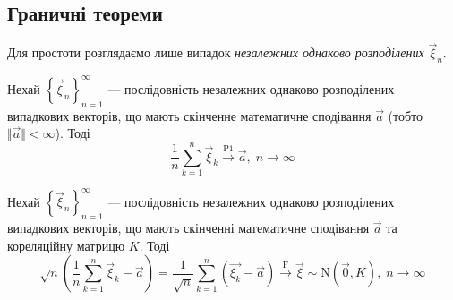 \subsection{Граничні теореми}
Для простоти розглядаємо лише випадок \emph{незалежних однаково розподілених} $\vec{\xi}_n$.
\begin{theorem*}
    Нехай $\left\{ \vec{\xi}_n\right\}_{n=1}^{\infty}$ --- послідовність незалежних однаково розподілених випадкових векторів, що мають скінченне
    математичне сподівання $\vec{a}$ (тобто $\Vert \vec{a} \Vert < \infty$). Тоді 
    $$
    \frac{1}{n} \sum\limits_{k=1}^n \vec{\xi}_k \overset{\mathrm{P1}}{\longrightarrow} \vec{a}, \; n \to \infty
    $$
\end{theorem*}
\begin{theorem*}
    Нехай $\left\{ \vec{\xi}_n\right\}_{n=1}^{\infty}$ --- послідовність незалежних однаково розподілених випадкових векторів, що мають скінченні
    математичне сподівання $\vec{a}$ та кореляційну матрицю $K$. Тоді
    $$
    \sqrt{n}\left( \frac{1}{n} \sum\limits_{k=1}^n \vec{\xi}_k - \vec{a}\right) = 
    \frac{1}{\sqrt{n}} \sum\limits_{k=1}^n \left( \vec{\xi_k} - \vec{a}\right) \overset{\mathrm{F}}{\longrightarrow} \vec{\xi} \sim \mathrm{N}\left(\vec{0}, K\right), \; n\to\infty
    $$
\end{theorem*}